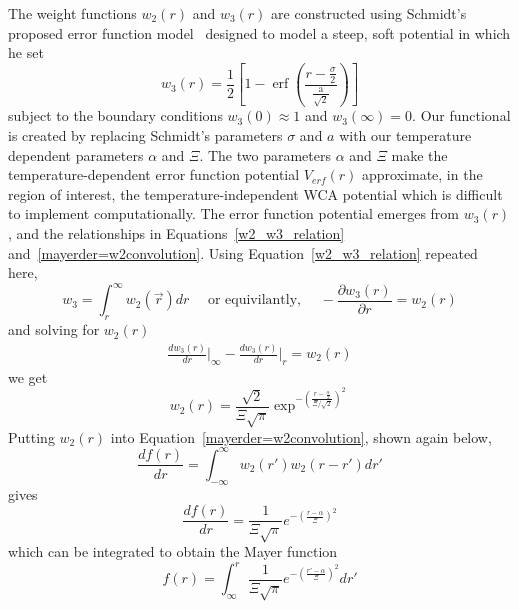 \documentclass[double,12pt]{beavtex}
\begin{document}
The weight functions $w_{2}(r)$ and $w_{3}(r)$ are constructed using 
Schmidt's proposed error function model~\cite{schmidt2000fluid} designed 
to model a steep, soft potential in which he set
\begin{equation}{w_3(r)=\frac{1}{2}}\left[1-\operatorname{erf}\left(\frac{r-\frac{\sigma}{2}}{\frac{\text{a}}{\sqrt{2}}}\right)\right]\end{equation} 
subject to the boundary conditions $w_3(0)\approx{1}$ 
and $w_3(\infty)=0$. 
Our functional is  created by replacing Schmidt's parameters $\sigma$ 
and $a$ with our temperature dependent parameters $\alpha$ and $\Xi$.
The two parameters $\alpha$ and $\Xi$ make the temperature-dependent error 
function potential $V_{erf}(r)$ approximate, in the region of interest, 
the temperature-independent WCA potential which is difficult 
to implement computationally. 
The error function potential emerges from $w_{3}(r)$, and the relationships 
in Equations~\ref{w2_w3_relation} and~\ref{mayerder=w2convolution}.
Using Equation~\ref{w2_w3_relation} repeated here,
\begin{displaymath}
     w_{3}=\int_{r}^{\infty}{w_{2}(\vec{r})dr}\mbox{~~~~or equivilantly,~~~~}-\frac{\partial{w_3(r)}}{\partial{r}}=w_2(r)
\end{displaymath}
and solving for $w_2(r)$
\begin{align}{\frac{dw_3(r)}{dr}\bigg|_{\infty}-\frac{dw_3(r)}{dr}\bigg|_{r}=w_2(r)}\end{align} 
we get \begin{equation}{ w_2(r)=\frac{\sqrt{2}}{\Xi\sqrt\pi}\exp^{-\left(\frac{r-\frac{\alpha}{2}}{\Xi/\sqrt{2}}\right)^2} }\end{equation} 
Putting $w_2(r)$ into Equation~\ref{mayerder=w2convolution}, shown again below, 
\begin{displaymath}
    \frac{df(r)}{dr}=\int_{-\infty}^{\infty}{w_2(r')w_2(r-r')dr'}
\end{displaymath}
gives
\begin{equation}{\frac{df(r)}{dr}=\frac{1}{\Xi\sqrt{\pi}}e^{-\left(\frac{r-\alpha}{\Xi}\right)^2}}\end{equation} 
which can be integrated to obtain the Mayer function
\begin{equation}{f(r)=\int_{\infty}^r{ \frac{1}{\Xi\sqrt{\pi}}e^{-\left(\frac{r'-\alpha}{\Xi}\right)^2}{dr'}}}\end{equation} 
\end{document}
